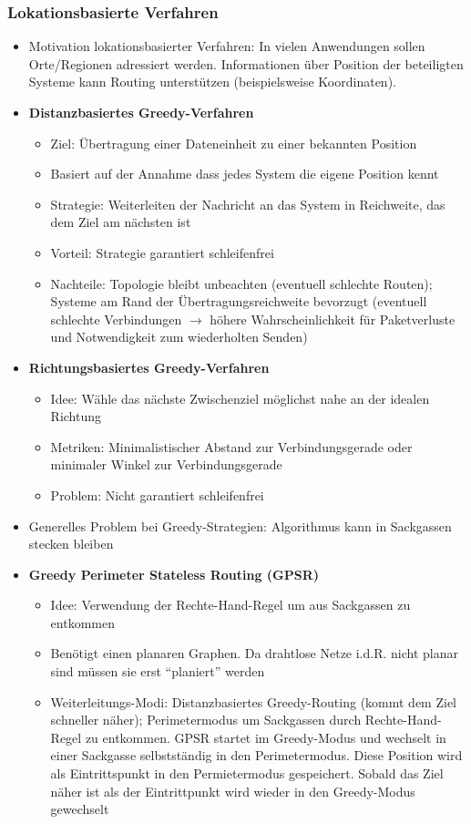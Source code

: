 \subsubsection{Lokationsbasierte Verfahren}
\begin{itemize}
	\item Motivation lokationsbasierter Verfahren: In vielen Anwendungen sollen Orte/Regionen adressiert werden. Informationen über Position der beteiligten Systeme kann Routing unterstützen (beispielsweise Koordinaten).
	\item \textbf{Distanzbasiertes Greedy-Verfahren}
	\begin{itemize}
		\item Ziel: Übertragung einer Dateneinheit zu einer bekannten Position
		\item Basiert auf der Annahme dass jedes System die eigene Position kennt
		\item Strategie: Weiterleiten der Nachricht an das System in Reichweite, das dem Ziel am nächsten ist
		\item Vorteil: Strategie garantiert schleifenfrei
		\item Nachteile: Topologie bleibt unbeachten (eventuell schlechte Routen); Systeme am Rand der Übertragungsreichweite bevorzugt (eventuell schlechte Verbindungen \(\rightarrow\) höhere Wahrscheinlichkeit für Paketverluste und Notwendigkeit zum wiederholten Senden)
	\end{itemize}
	\item \textbf{Richtungsbasiertes Greedy-Verfahren}
	\begin{itemize}
		\item Idee: Wähle das nächste Zwischenziel möglichst nahe an der idealen Richtung
		\item Metriken: Minimalistischer Abstand zur Verbindungsgerade oder minimaler Winkel zur Verbindungsgerade
		\item Problem: Nicht garantiert schleifenfrei
	\end{itemize}
	\item Generelles Problem bei Greedy-Strategien: Algorithmus kann in Sackgassen stecken bleiben
	\item \textbf{Greedy Perimeter Stateless Routing (GPSR)}
	\begin{itemize}
		\item Idee: Verwendung der Rechte-Hand-Regel um aus Sackgassen zu entkommen
		\item Benötigt einen planaren Graphen. Da drahtlose Netze i.d.R. nicht planar sind müssen sie erst "`planiert"' werden
		\item Weiterleitungs-Modi: Distanzbasiertes Greedy-Routing (kommt dem Ziel schneller näher); Perimetermodus um Sackgassen durch Rechte-Hand-Regel zu entkommen. GPSR startet im Greedy-Modus und wechselt in einer Sackgasse selbstständig in den Perimetermodus. Diese Position wird als Eintrittspunkt in den Permietermodus gespeichert. Sobald das Ziel näher ist als der Eintrittpunkt wird wieder in den Greedy-Modus gewechselt
	\end{itemize}
\end{itemize}

